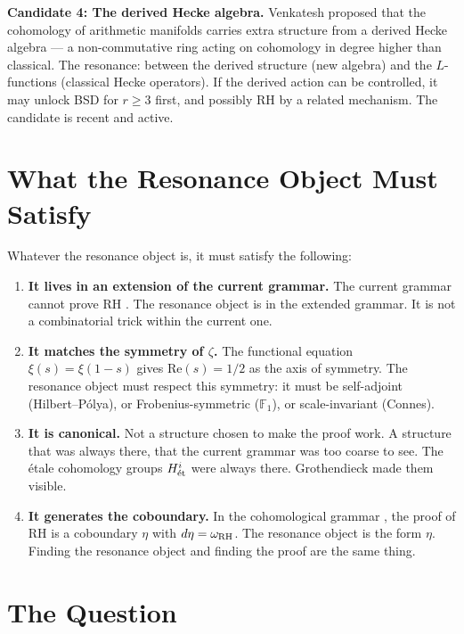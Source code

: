 \documentclass[12pt]{article}
\theoremstyle{definition}
\theoremstyle{remark}
\begin{document}
\textbf{Candidate 4: The derived Hecke algebra.}
Venkatesh proposed that the cohomology of arithmetic manifolds
carries extra structure from a derived Hecke algebra ---
a non-commutative ring acting on cohomology in degree higher than classical.
The resonance: between the derived structure (new algebra)
and the $L$-functions (classical Hecke operators).
If the derived action can be controlled,
it may unlock BSD for $r \geq 3$ first,
and possibly RH by a related mechanism.
The candidate is recent and active.

\section{What the Resonance Object Must Satisfy}

Whatever the resonance object is,
it must satisfy the following:

\begin{enumerate}
\item \textbf{It lives in an extension of the current grammar.}
The current grammar cannot prove RH \cite{grammar}.
The resonance object is in the extended grammar.
It is not a combinatorial trick within the current one.

\item \textbf{It matches the symmetry of $\zeta$.}
The functional equation $\xi(s) = \xi(1-s)$ gives $\mathrm{Re}(s) = 1/2$
as the axis of symmetry.
The resonance object must respect this symmetry:
it must be self-adjoint (Hilbert--P\'olya),
or Frobenius-symmetric ($\mathbb{F}_1$),
or scale-invariant (Connes).

\item \textbf{It is canonical.}
Not a structure chosen to make the proof work.
A structure that was always there,
that the current grammar was too coarse to see.
The \'etale cohomology groups $H^i_{\rm\acute{e}t}$ were always there.
Grothendieck made them visible.

\item \textbf{It generates the coboundary.}
In the cohomological grammar \cite{grammar},
the proof of RH is a coboundary $\eta$
with $d\eta = \omega_{\rm RH}$.
The resonance object is the form $\eta$.
Finding the resonance object and finding the proof are the same thing.
\end{enumerate}

\section{The Question}
\end{document}
